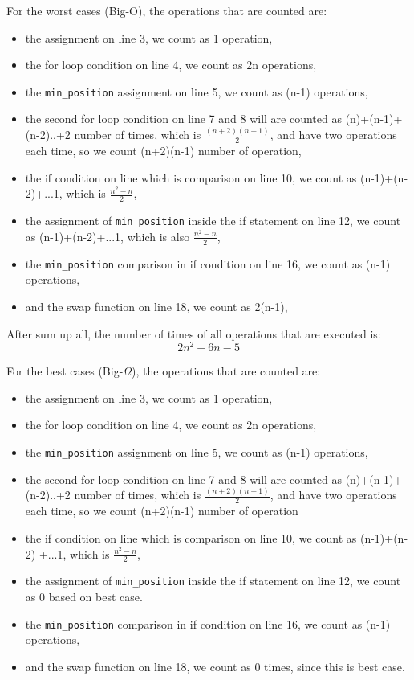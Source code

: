\documentclass[11pt]{article}
\begin{document}
For the worst cases (Big-O), the operations that are counted are:
\begin{itemize}
\item the assignment on line 3, we count as 1 operation, 
\item the for loop condition on line 4, we count as 2n operations,
\item the \texttt{min\_position} assignment on line 5, we count as (n-1) operations,
\item the second for loop condition on line 7 and 8 will are counted as (n)+(n-1)+(n-2)..+2 number of times, which is $\frac{(n+2)(n-1)}{2}$, and have two operations each time, so we count (n+2)(n-1) number of operation,
\item the if condition on line which is comparison on line 10, we count as (n-1)+(n-2)+...1, which is $\frac{n^2-n}{2}$,
\item the assignment of \texttt{min\_position} inside the if statement on line 12, we count as (n-1)+(n-2)+...1, which is also $\frac{n^2-n}{2}$,
\item the \texttt{min\_position} comparison in if condition on line 16, we count as (n-1) operations,
\item and the swap function on line 18, we count as 2(n-1),
\end{itemize}

After sum up all, the number of times of all operations that are executed is:
\[
2n^2+6n-5
\]

For the best cases (Big-$\Omega$), the operations that are counted are:
\begin{itemize}
\item the assignment on line 3, we count as 1 operation, 
\item the for loop condition on line 4, we count as 2n operations,
\item the \texttt{min\_position} assignment on line 5, we count as (n-1) operations,
\item the second for loop condition on line 7 and 8 will are counted as (n)+(n-1)+(n-2)..+2 number of times, which is $\frac{(n+2)(n-1)}{2}$, and have two operations each time, so we count (n+2)(n-1) number of operation
\item the if condition on line which is comparison on line 10, we count as (n-1)+(n-2)
+...1, which is $\frac{n^2-n}{2}$,
\item the assignment of \texttt{min\_position} inside the if statement on line 12, we count as 0 based on best case.
\item the \texttt{min\_position} comparison in if condition on line 16, we count as (n-1) operations,
\item and the swap function on line 18, we count as 0 times, since this is best case.
\end{itemize}
\end{document}
